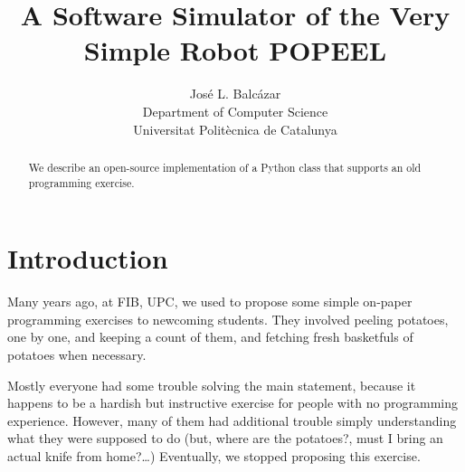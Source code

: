 \documentclass[12pt]{article}
\title{A Software Simulator of the Very Simple Robot POPEEL%
}
\author{Jos\'e L. Balc\'azar \\
{Department of Computer Science} \\
{Universitat Polit\`ecnica de Catalunya}}
\begin{document}
\maketitle

\begin{abstract}
We describe an open-source implementation of a
Python class that supports an old programming
exercise.
\end{abstract}


\section{Introduction}%

Many years ago, at FIB, UPC, we used to propose some 
simple on-paper programming exercises to newcoming 
students. They involved peeling potatoes, one by one, 
and keeping a count of them, and fetching fresh 
basketfuls of potatoes when necessary. 

Mostly everyone had some trouble solving the main
statement, because it happens to be a hardish but 
instructive exercise for people with no programming 
experience. However, many of them had additional 
trouble simply understanding what they were supposed 
to do (but, where are the potatoes?, must I bring 
an actual knife from home?\dots) Eventually, we
stopped proposing this exercise.
\end{document}
